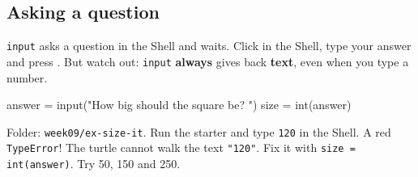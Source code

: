\subsection{Asking a question}
\texttt{input} asks a question in the Shell and waits. Click in the Shell, type your answer and press . But watch out: \texttt{input} \textbf{always} gives back \textbf{text}, even when you type a number.
\begin{center}
\end{center}
\begin{pycode}
answer = input("How big should the square be? ")
size = int(answer)
\end{pycode}

\begin{exercise}
Folder: \texttt{week09/ex-size-it}. Run the starter and type \texttt{120} in the Shell. A red \texttt{TypeError}! The turtle cannot walk the text \texttt{"120"}. Fix it with \texttt{size = int(answer)}. Try 50, 150 and 250.
\end{exercise}

